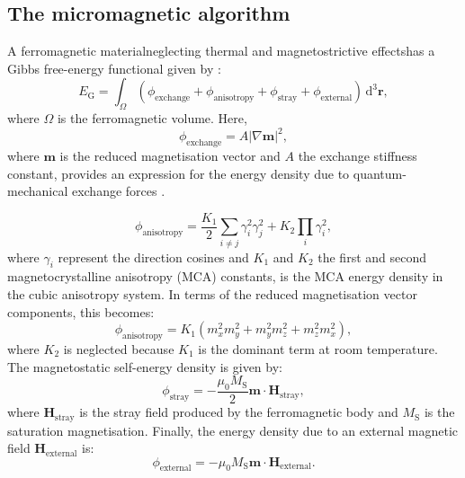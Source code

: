 \subsection{The micromagnetic algorithm}
A ferromagnetic material{\textemdash}neglecting thermal and magnetostrictive effects{\textemdash}has a Gibbs free-energy functional given by \citep{Brown}:
\begin{equation}
E_\text{G} = \int_{\Omega} (\phi_{\text{exchange}} + \phi_{\text{anisotropy}} + \phi_{\text{stray}} + \phi_{\text{external}})\,\text{d}^3 \boldsymbol{r},
\end{equation}
where $\Omega$ is the ferromagnetic volume. Here,
\begin{equation}
\phi_{\text{exchange}}=A|\nabla\boldsymbol{m}|^2,
\end{equation}
where $\boldsymbol{m}$ is the reduced magnetisation vector and $A$ the exchange stiffness constant, provides an expression for the energy density due to quantum-mechanical exchange forces \citep{Landau1935}.\par
\begin{equation}
\phi_{\text{anisotropy}}=\frac{K_1}{2}\sum_{i\neq j}\gamma_i^2\gamma_j^2 + K_2\prod_i\gamma_i^2,
\end{equation}
where $\gamma_i$ represent the direction cosines and $K_1$ and $K_2$ the first and second magnetocrystalline anisotropy (MCA) constants, is the MCA energy density in the cubic anisotropy system. In terms of the reduced magnetisation vector components, this becomes:
\begin{equation}
\phi_{\text{anisotropy}}=K_1(m_x^2m_y^2+m_y^2m_z^2+m_z^2m_x^2),
\end{equation}
where $K_2$ is neglected because $K_1$ is the dominant term at room temperature. The magnetostatic self-energy density is given by:
\begin{equation}
\phi_{\text{stray}}=-\frac{\mu_0M_\text{S}}{2}\boldsymbol{m}\cdot\boldsymbol{H}_{\text{stray}},
\end{equation}
where $\boldsymbol{H}_{\text{stray}}$ is the stray field produced by the ferromagnetic body and $M_\text{S}$ is the saturation magnetisation. Finally, the energy density due to an external magnetic field $\boldsymbol{H}_{\text{external}}$ is:
\begin{equation}
\phi_{\text{external}}=-\mu_0M_\text{S}\boldsymbol{m}\cdot\boldsymbol{H}_{\text{external}}.
\end{equation}\par

